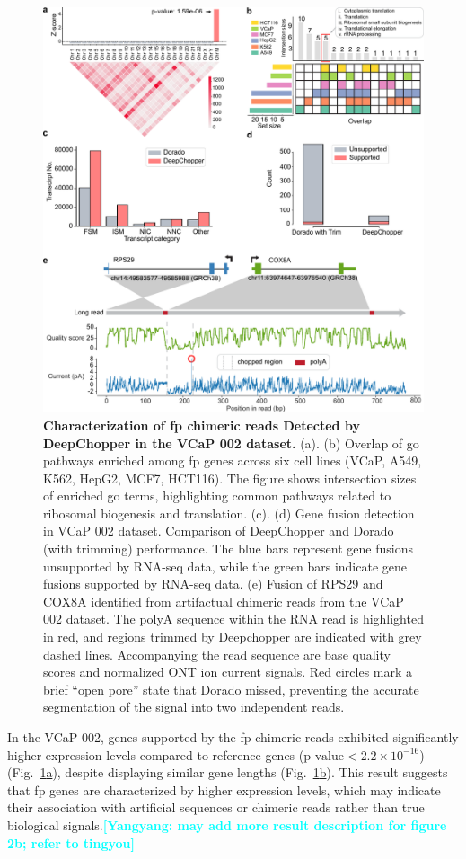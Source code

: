 \documentclass[pdflatex, sn-mathphys-num, lineno]{sn-jnl}%
\newcommand{\yy}[1]{\textcolor{cyan}{\textbf{[Yangyang: #1]}}}
\newcommand{\figref}[2]{Fig.~\hyperref[#1]{\ref*{#1}#2}}
\theoremstyle{thmstyleone}%
\theoremstyle{thmstyletwo}%
\theoremstyle{thmstylethree}%
\begin{document}
\begin{figure}[!h]
	\includegraphics[height=1\columnwidth]{finals/figure2}
	\caption{{\bf Characterization of \gls{fp} chimeric reads Detected by DeepChopper in the VCaP 002 dataset.} (a). (b) Overlap of \gls{go} pathways enriched among \gls{fp} genes across six cell lines (VCaP, A549, K562, HepG2, MCF7, HCT116). The figure shows intersection sizes of enriched \gls{go} terms, highlighting common pathways related to ribosomal biogenesis and translation. (c). (d) Gene fusion detection in VCaP 002 dataset. Comparison of DeepChopper and Dorado (with trimming) performance. The blue bars represent gene fusions unsupported by RNA-seq data, while the green bars indicate gene fusions supported by RNA-seq data. (e) Fusion of RPS29 and COX8A identified from artifactual chimeric reads from the VCaP 002 dataset. The polyA sequence within the RNA read is highlighted in red, and regions trimmed by Deepchopper are indicated with grey dashed lines. Accompanying the read sequence are base quality scores and normalized ONT ion current signals. Red circles mark a brief ``open pore'' state that Dorado missed, preventing the accurate segmentation of the signal into two independent reads.}\label{fig:f2}
\end{figure}

In the VCaP 002, genes supported by the \gls{fp} chimeric reads exhibited significantly higher expression levels compared to reference genes (\(\textrm{p-value} < 2.2 \times 10^{-16}\)) (\figref{fig:f2}{a}), despite displaying similar gene lengths (\figref{fig:f2}{b}).
This result suggests that \gls{fp} genes are characterized by higher expression levels, which may indicate their association with artificial sequences or chimeric reads rather than true biological signals.\yy{may add more result description for figure 2b; refer to tingyou}
\end{document}
